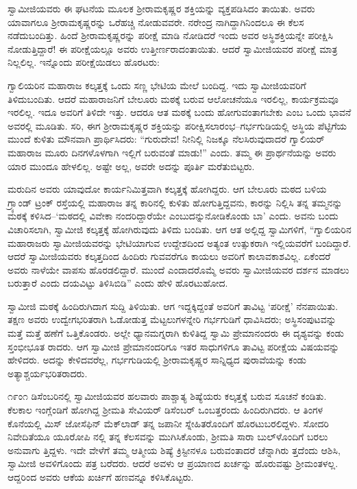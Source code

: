 ಸ್ವಾಮೀಜಿಯವರು ಈ ಘಟನೆಯ ಮೂಲಕ ಶ್ರೀರಾಮಕೃಷ್ಣರ ಶಕ್ತಿಯನ್ನು ವ್ಯಕ್ತಪಡಿಸಿದಂ ತಾಯಿತು. ಅವರು ಯಾವಾಗಲೂ ಶ್ರೀರಾಮಕೃಷ್ಣರನ್ನು ಒರೆಹಚ್ಚಿ ನೋಡುವವರೇ. ನರೇಂದ್ರ ನಾಗಿದ್ದಾಗಿನಿಂದಲೂ ಈ ಕೆಲಸ ನಡೆದುಬಂದಿತ್ತು. ಹಿಂದೆ ಶ್ರೀರಾಮಕೃಷ್ಣರನ್ನು ಪರೀಕ್ಷೆ ಮಾಡಿ ನೋಡಿದರೆ ಇಂದು ಅವರ ಅಸ್ಥಿಶಕ್ತಿಯನ್ನೇ ಪರೀಕ್ಷಿಸಿ ನೋಡುತ್ತಿದ್ದಾರೆ! ಈ ಪರೀಕ್ಷೆಯಲ್ಲೂ ಅವರು ಉತ್ತೀರ್ಣರಾದಂತಾಯಿತು. ಆದರೆ ಸ್ವಾಮೀಜಿಯವರ ಪರೀಕ್ಷೆ ಮಾತ್ರ ನಿಲ್ಲಲಿಲ್ಲ. ಇನ್ನೊಂದು ಪರೀಕ್ಷೆಯಿಡಲು ಹೊರಟರು:

ಗ್ವಾಲಿಯರಿನ ಮಹಾರಾಜ ಕಲ್ಕತ್ತಕ್ಕೆ ಒಂದು ಸಣ್ಣ ಭೇಟಿಯ ಮೇಲೆ ಬಂದಿದ್ದ. ಇದು ಸ್ವಾಮೀಜಿಯವರಿಗೆ ತಿಳಿದುಬಂದಿತು. ಆದರೆ ಮಹಾರಾಜನಿಗೆ ಬೇಲೂರು ಮಠಕ್ಕೆ ಬರುವ ಆಲೋಚನೆಯೂ ಇರಲಿಲ್ಲ, ಕಾರ್ಯಕ್ರಮವೂ ಇರಲಿಲ್ಲ. ಇದೂ ಅವರಿಗೆ ತಿಳಿದೇ ಇತ್ತು. ಆದರೂ ಆತ ಮಠಕ್ಕೆ ಬಂದು ಹೋಗುವಂತಾಗಬೇಕು ಎಂಬ ಒಂದು ಭಾವನೆ ಅವರಲ್ಲಿ ಮೂಡಿತು. ಸರಿ, ಈಗ ಶ್ರೀರಾಮಕೃಷ್ಣರ ಶಕ್ತಿಯನ್ನು ಪರೀಕ್ಷಿಸಲಾರಂಭ–ಗರ್ಭಗುಡಿಯಲ್ಲಿ ಅಸ್ಥಿಯ ಪೆಟ್ಟಿಗೆಯ ಮುಂದೆ ಕುಳಿತು ಮೌನವಾಗಿ ಪ್ರಾರ್ಥಿಸಿದರು: “ಗುರುದೇವ! ನೀನಿಲ್ಲಿ ನಿಜಕ್ಕೂ ನೆಲಸಿರುವುದಾದರೆ ಗ್ವಾಲಿಯರ್ ಮಹಾರಾಜ ಮೂರು ದಿನಗಳೊಳಗಾಗಿ ಇಲ್ಲಿಗೆ ಬರುವಂತೆ ಮಾಡು!” ಎಂದು. ತಮ್ಮ ಈ ಪ್ರಾರ್ಥನೆಯನ್ನು ಅವರು ಯಾರ ಮುಂದೂ ಹೇಳಲಿಲ್ಲ. ಅಷ್ಟೇ ಅಲ್ಲ, ಅವರೇ ಅದನ್ನು ಪೂರ್ತಿ ಮರೆತುಬಿಟ್ಟರು.

ಮರುದಿನ ಅವರು ಯಾವುದೋ ಕಾರ್ಯನಿಮಿತ್ತವಾಗಿ ಕಲ್ಕತ್ತಕ್ಕೆ ಹೋಗಿದ್ದರು. ಆಗ ಬೇಲೂರು ಮಠದ ಬಳಿಯ ಗ್ರ್ಯಾಂಡ್ ಟ್ರಂಕ್ ರಸ್ತೆಯಲ್ಲಿ ಮಹಾರಾಜ ತನ್ನ ಕಾರಿನಲ್ಲಿ ಕುಳಿತು ಹೋಗುತ್ತಿದ್ದವನು, ಕಾರನ್ನು ನಿಲ್ಲಿಸಿ ತನ್ನ ತಮ್ಮನನ್ನು ಮಠಕ್ಕೆ ಕಳಿಸಿದ–‘ಮಠದಲ್ಲಿ ವಿವೇಕಾ ನಂದರಿದ್ದಾರೆಯೇ ಎಂಬುದನ್ನುನೋಡಿಕೊಂಡು ಬಾ’ ಎಂದು. ಅವನು ಬಂದು ವಿಚಾರಿಸಲಾಗಿ, ಸ್ವಾಮೀಜಿ ಕಲ್ಕತ್ತಕ್ಕೆ ಹೋಗಿರುವುದು ತಿಳಿದು ಬಂದಿತು. ಆಗ ಆತ ಅಲ್ಲಿದ್ದ ಸ್ವಾಮಿಗಳಿಗೆ, “ಗ್ವಾಲಿಯರಿನ ಮಹಾರಾಜರು ಸ್ವಾಮೀಜಿಯವರನ್ನು ಭೇಟಿಯಾಗುವ ಉದ್ದೇಶದಿಂದ ಅತ್ಯಂತ ಉತ್ಸುಕರಾಗಿ ಇಲ್ಲಿಯವರೆಗೆ ಬಂದಿದ್ದಾರೆ. ಆದರೆ ಸ್ವಾಮೀಜಿಯವರು ಕಲ್ಕತ್ತದಿಂದ ಹಿಂದಿರು ಗುವವರೆಗೂ ಕಾಯಲು ಅವರಿಗೆ ಕಾಲಾವಕಾಶವಿಲ್ಲ. ಏಕೆಂದರೆ ಅವರು ನಾಳೆಯೇ ವಾಪಸು ಹೊರಡಲಿದ್ದಾರೆ. ಮುಂದೆ ಎಂದಾದರೊಮ್ಮೆ ಅವರು ಸ್ವಾಮೀಜಿಯವರ ದರ್ಶನ ಮಾಡಲು ಬರುತ್ತಾರೆ ಎಂದು ದಯವಿಟ್ಟು ತಿಳಿಸಿಬಿಡಿ” ಎಂದು ಹೇಳಿ ಹೊರಟುಹೋದ.

ಸ್ವಾಮೀಜಿ ಮಠಕ್ಕೆ ಹಿಂದಿರುಗಿದಾಗ ಸುದ್ದಿ ತಿಳಿಯಿತು. ಆಗ ಇದ್ದಕ್ಕಿದ್ದಂತೆ ಅವರಿಗೆ ತಾವಿಟ್ಟ ‘ಪರೀಕ್ಷೆ’ ನೆನಪಾಯಿತು. ತಕ್ಷಣ ಅವರು ಉದ್ವೇಗಭರಿತರಾಗಿ ಓಡೋಡುತ್ತ ಮೆಟ್ಟಲುಗಳನ್ನೇರಿ ಗರ್ಭಗುಡಿಗೆ ಧಾವಿಸಿದರು; ಅಸ್ಥಿಸಂಪುಟವನ್ನು ಮತ್ತೆ ಮತ್ತೆ ಹಣೆಗೆ ಒತ್ತಿಕೊಂಡರು. ಅಲ್ಲೇ ಧ್ಯಾನಮಗ್ನರಾಗಿ ಕುಳಿತಿದ್ದ ಸ್ವಾಮಿ ಪ್ರೇಮಾನಂದರು ಈ ದೃಶ್ಯವನ್ನು ಕಂಡು ಸ್ತಂಭೀಭೂತ ರಾದರು. ಆಗ ಸ್ವಾಮೀಜಿ ಪ್ರೇಮಾನಂದರಿಗೂ ಇತರ ಸಾಧುಗಳಿಗೂ ತಾವಿಟ್ಟ ಪರೀಕ್ಷೆಯ ವಿಷಯವನ್ನು ಹೇಳಿದರು. ಅದನ್ನು ಕೇಳಿದವರೆಲ್ಲ, ಗರ್ಭಗುಡಿಯಲ್ಲಿ ಶ್ರೀರಾಮಕೃಷ್ಣರ ಸಾನ್ನಿಧ್ಯದ ಪುರಾವೆಯನ್ನು ಕಂಡು ಅತ್ಯಾಶ್ಚರ್ಯಭರಿತರಾದರು.

೧೯ಂ೧ ಡಿಸೆಂಬರಿನಲ್ಲಿ ಸ್ವಾಮೀಜಿಯವರ ಹಲವಾರು ಪಾಶ್ಚಾತ್ಯ ಶಿಷ್ಯೆಯರು ಕಲ್ಕತ್ತಕ್ಕೆ ಬರುವ ಸೂಚನೆ ಕಂಡಿತು. ಕೆಲಕಾಲ ಇಂಗ್ಲೆಂಡಿಗೆ ಹೋಗಿದ್ದ ಶ್ರೀಮತಿ ಸೇವಿಯರ್ ಡಿಸೆಂಬರ್ ಒಂಬತ್ತರಂದು ಹಿಂದಿರುಗಿದರು. ಆ ತಿಂಗಳ ಕೊನೆಯಲ್ಲಿ ಮಿಸ್ ಜೋಸೆಫಿನ್ ಮೆಕ್​ಲಾಡ್ ತನ್ನ ಜಪಾನೀ ಸ್ನೇಹಿತರೊಂದಿಗೆ ಹೊರಟುಬರಲಿದ್ದಳು. ಸೋದರಿ ನಿವೇದಿತೆಯೂ ಯೂರೋಪಿ ನಲ್ಲಿ ತನ್ನ ಕೆಲಸವನ್ನು ಮುಗಿಸಿಕೊಂಡು, ಶ್ರೀಮತಿ ಸಾರಾ ಬುಲ್​ಳೊಂದಿಗೆ ಬರಲು ಅನುವಾಗು ತ್ತಿದ್ದಳು. ಇದೇ ವೇಳೆಗೆ ತಮ್ಮ ಆತ್ಮೀಯ ಶಿಷ್ಯೆ ಕ್ರಿಸ್ಟೀನಳೂ ಬರುವಂತಾದರೆ ಚೆನ್ನಾಗಿರು ತ್ತದೆಂದು ಆಶಿಸಿ, ಸ್ವಾಮೀಜಿ ಅವಳಿಗೊಂದು ಪತ್ರ ಬರೆದರು. ಆದರೆ ಅವಳು ಆ ಪ್ರಯಾಣದ ಖರ್ಚನ್ನು ಹೊರುವಷ್ಟು ಶ್ರೀಮಂತಳಲ್ಲ. ಆದ್ದರಿಂದ ಅವರು ಆಕೆಯ ಖರ್ಚಿಗೆ ಹಣವನ್ನೂ ಕಳಿಸಿಕೊಟ್ಟರು.


